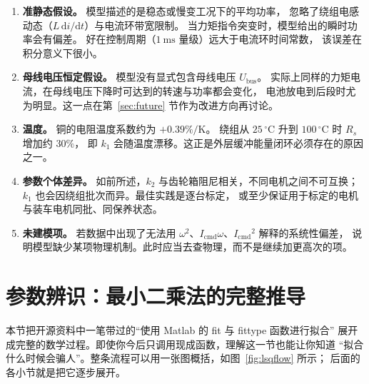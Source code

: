 \documentclass[cn,blue,11pt,device=normal]{elegantnote}
\newcommand{\code}[1]{{\ttfamily\small\def\_{\textunderscore\allowbreak}#1}}
\newcommand{\Icmd}{I_{\mathrm{cmd}}{}}
\newcommand{\dd}{\mathrm{d}}
\begin{document}
\begin{enumerate}
  \item \textbf{准静态假设。} 模型描述的是稳态或慢变工况下的平均功率，
  忽略了绕组电感动态（$L\,\dd i/\dd t$）与电流环带宽限制。
  当力矩指令突变时，模型给出的瞬时功率会有偏差。
  好在控制周期（$1\ \mathrm{ms}$ 量级）远大于电流环时间常数，
  该误差在积分意义下很小。
  \item \textbf{母线电压恒定假设。} 模型没有显式包含母线电压 $U_{\mathrm{bus}}$。
  实际上同样的力矩电流，在母线电压下降时可达到的转速与功率都会变化，
  电池放电到后段时尤为明显。这一点在第~\ref{sec:future} 节作为改进方向再讨论。
  \item \textbf{温度。} 铜的电阻温度系数约为 $+0.39\%/\mathrm{K}$。
  绕组从 $25\,^{\circ}\mathrm{C}$ 升到 $100\,^{\circ}\mathrm{C}$ 时 $R_s$ 增加约 $30\%$，
  即 $k_1$ 会随温度漂移。这正是外层缓冲能量闭环必须存在的原因之一。
  \item \textbf{参数个体差异。} 如前所述，$k_2$ 与齿轮箱阻尼相关，不同电机之间不可互换；
  $k_1$ 也会因绕组批次而异。最佳实践是逐台标定，
  或至少保证用于标定的电机与装车电机同批、同保养状态。
  \item \textbf{未建模项。} 若数据中出现了无法用 $\omega^2$、$\Icmd\omega$、$\Icmd^2$ 解释的系统性偏差，
  说明模型缺少某项物理机制。此时应当去查物理，而不是继续加更高次的项。
\end{enumerate}

\section{参数辨识：最小二乘法的完整推导}\label{sec:lsq}

本节把开源资料中一笔带过的“使用 Matlab 的 \code{fit} 与 \code{fittype} 函数进行拟合”
展开成完整的数学过程。即使你今后只调用现成函数，理解这一节也能让你知道
“拟合什么时候会骗人”。整条流程可以用一张图概括，如图~\ref{fig:lsqflow} 所示；
后面的各小节就是把它逐步展开。
\end{document}
